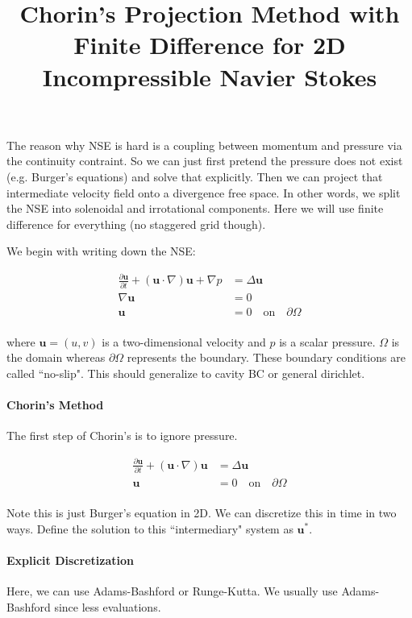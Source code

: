 \documentclass[12pt]{article}
\begin{document}
\title{Chorin's Projection Method with Finite Difference for 2D Incompressible Navier Stokes}
\maketitle

The reason why NSE is hard is a coupling between momentum and pressure via the continuity contraint. So we can just first pretend the pressure does not exist (e.g. Burger's equations) and solve that explicitly. Then we can project that intermediate velocity field onto a divergence free space. In other words, we split the NSE into solenoidal and irrotational components. Here we will use finite difference for everything (no staggered grid though).

We begin with writing down the NSE:

\begin{align*}
    \frac{\partial{\mathbf{u}}}{\partial t} + (\mathbf{u} \cdot \nabla)\mathbf{u} + \nabla p &= \Delta \mathbf{u} \\
    \nabla \mathbf{u} &= 0 \\
    \mathbf{u} &= 0 \quad  \text{on} \quad  \partial \Omega \\
\end{align*}

where $\mathbf{u} = (u,v)$ is a two-dimensional velocity and $p$ is a scalar pressure. $\Omega$ is the domain whereas $\partial \Omega$ represents the boundary. These boundary conditions are called ``no-slip". This should generalize to cavity BC or general dirichlet.

\paragraph{Chorin's Method}
The first step of Chorin's is to ignore pressure.

\begin{align*}
    \frac{\partial{\mathbf{u}}}{\partial t} + (\mathbf{u} \cdot \nabla)\mathbf{u} &= \Delta \mathbf{u} \\
    \mathbf{u} &= 0 \quad  \text{on} \quad  \partial \Omega \\
\end{align*}

Note this is just Burger's equation in 2D. We can discretize this in time in two ways. Define the solution to this ``intermediary" system as $\mathbf{u}^*$.

\paragraph{Explicit Discretization}
Here, we can use Adams-Bashford or Runge-Kutta. We usually use Adams-Bashford since less evaluations.
\end{document}
